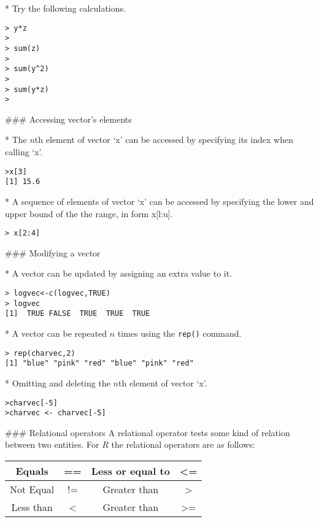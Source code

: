\begin{frame}[fragile]
\begin{itemize}
*  Try the following calculations.
\begin{verbatim}
> y*z
>
> sum(z)
>
> sum(y^2)
>
> sum(y*z)
>
\end{verbatim}


### {Accessing vector's elements}


*  The $n$th element of vector `x' can be accessed by
specifying its index when calling `x'.
\begin{verbatim}
>x[3]
[1] 15.6
\end{verbatim}

*  A sequence of  elements of vector `x' can be accessed by
specifying the lower and upper bound of the the range, in form
x[l:u].
\begin{verbatim}
> x[2:4]
\end{verbatim}





### {Modifying a vector}


*  A vector can be updated by assigning an extra value to it.
\begin{verbatim}
> logvec<-c(logvec,TRUE)
> logvec
[1]  TRUE FALSE  TRUE  TRUE  TRUE
\end{verbatim}

*  A vector can be repeated $n$ times using the \texttt{rep()} command.
\begin{verbatim}
> rep(charvec,2)
[1] "blue" "pink" "red" "blue" "pink" "red"
\end{verbatim}

*  Omitting and deleting the $n$th element of vector `x'.
\begin{verbatim}
>charvec[-5]
>charvec <- charvec[-5]
\end{verbatim}



### {Relational operators}
A relational operator tests some kind of relation between two
entities. For $R$ the relational operators are as follows:
\begin{center}
\begin{tabular}{|c|c|c|c|}
  \hline

  Equals & == & Less or equal to  & <= \\
  \hline
  Not Equal & != & Greater than & > \\
  \hline
  Less than & < & Greater than & >= \\
  \hline
\end{tabular}
\end{center}


\end{itemize}
\end{frame}
